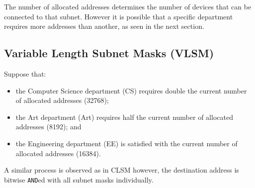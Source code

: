 \documentclass[a4paper]{systems-software}
\begin{document}
The number of allocated addresses determines the number of devices that can be connected to that subnet. However it is possible that a specific department requires more addresses than another, as seen in the next section.


\subsection*{Variable Length Subnet Masks (VLSM)}

Suppose that:
\begin{itemize}
	\item the Computer Science department (CS) requires double the current number of allocated addresses (32768);
	\item the Art department (Art) requires half the current number of allocated addresses (8192); and
	\item the Engineering department (EE) is satisfied with the current number of allocated addresses (16384).
\end{itemize}

A similar process is observed as in CLSM however, the destination address is bitwise \texttt{AND}ed with all subnet masks individually.
\end{document}
